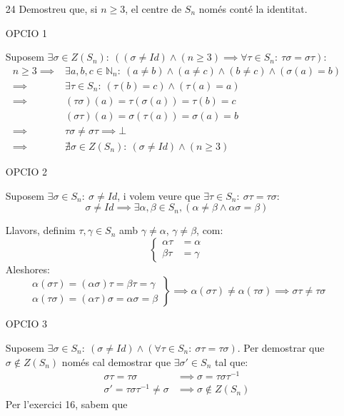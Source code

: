 \documentclass[a4paper, 11pt]{article}
\newcommand{\tq}{:\ }
\begin{document}
\begin{enumerate}
	\item[24] Demostreu que, si $n \geq 3$, el centre de $S_n$ només conté la identitat.

		OPCIO 1

		Suposem $\exists \sigma \in Z(S_n) \tq ((\sigma \neq Id) \land (n \geq 3) \implies \forall \tau \in S_n \tq \tau\sigma = \sigma\tau)$:
		\[\begin{aligned}
			n \geq 3 \implies & \exists a, b, c \in \mathbb{N}_n \tq (a \neq b) \land (a \neq c) \land (b \neq c) \land (\sigma (a) = b) \\ 
			\implies & \exists \tau \in S_n \tq (\tau (b) = c) \land (\tau (a) = a) \\
			\implies & (\tau\sigma)(a) = \tau (\sigma (a)) = \tau (b) = c \\
			& (\sigma\tau)(a) = \sigma (\tau (a)) = \sigma (a) = b \\
			\implies & \tau\sigma \neq \sigma\tau \implies \bot \\ 
			\implies & \nexists \sigma \in Z(S_n) \tq (\sigma \neq Id) \land (n \geq 3)
		\end{aligned}\]
	
		OPCIO 2

		Suposem $\exists \sigma \in S_n \tq \sigma \neq Id$, i volem veure que $\exists \tau \in S_n \tq \sigma \tau = \tau \sigma$:
		\[\sigma \neq Id \implies \exists \alpha, \beta \in S_n, (\alpha \neq \beta \land \alpha \sigma = \beta)\]
		
		Llavors, definim $\tau, \gamma \in S_n$ amb $\gamma \neq \alpha$, $\gamma \neq \beta$, com:
		\[\left\{\begin{aligned}
			\alpha \tau & = \alpha \\
			\beta \tau & = \gamma
		\end{aligned}\right.\]
		Aleshores:
		\[\left.\begin{aligned}
			\alpha (\sigma \tau) = (\alpha \sigma) \tau = \beta \tau = \gamma \\
			\alpha (\tau \sigma) = (\alpha \tau) \sigma = \alpha \sigma = \beta
		\end{aligned}\right\} \implies \alpha (\sigma \tau) \neq \alpha (\tau \sigma) \implies \sigma \tau \neq \tau \sigma\]

		OPCIO 3

		Suposem $\exists \sigma \in S_n \tq (\sigma \neq Id) \land (\forall \tau \in S_n \tq \sigma \tau = \tau \sigma)$. Per demostrar que $\sigma \not\in Z (S_n)$ només cal demostrar que $\exists \sigma' \in S_n$ tal que:
		\[\begin{aligned}
			\sigma \tau = \tau \sigma & \implies \sigma = \tau \sigma \tau^{-1} \\
			\sigma' = \tau \sigma \tau^{-1} \neq \sigma & \implies \sigma \not\in Z (S_n)
		\end{aligned}\]
		Per l'exercici 16, sabem que  

		
\end{enumerate}
\end{document}

